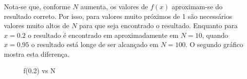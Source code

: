 Nota-se que, conforme $N$ aumenta, os valores de $f(x)$ aproximam-se do resultado correto. 
Por isso, para valores muito próximos de 1 são necessários valores muito altos de $N$ para que seja encontrado o resultado.
Enquanto para $x = 0.2$ o resultado é encontrado em aproximadamente em $N = 10$, quando $x = 0.95$ o resultado está longe de ser alcançado em $N = 100$.
O segundo gráfico mostra esta diferença.

\begin{figure}[htbp]
\begin{center}
\caption{f(0.2) vs N}
\label{fig_rotacao}
\end{center}
\end{figure}



\begin{verbatim}
\end{verbatim}



